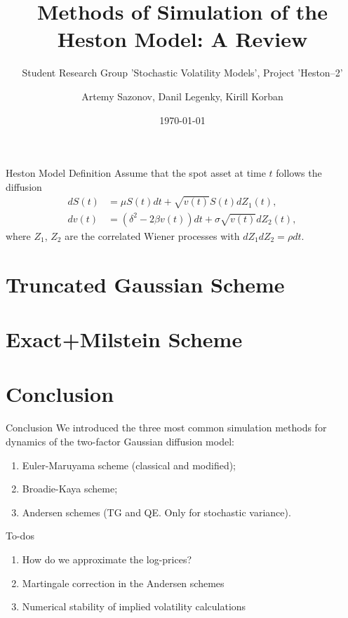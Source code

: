 \documentclass[aspectratio=169]{beamer}
\subtitle{Student Research Group 'Stochastic Volatility Models', Project 'Heston--2'}
\title{Methods of Simulation of the Heston Model: A Review}
\author{Artemy Sazonov, Danil Legenky, Kirill Korban}
\institute{Lomonosov Moscow State Univesity, Faculty of Mechanics and Mathematics}
\date{\today}
\begin{document}
    \maketitle

    \begin{frame}{Heston Model Definition}
        Assume that the spot asset at time $t$ follows the diffusion
        \begin{align}
            dS(t) & = \mu S(t)dt + \sqrt{v(t)} S(t) dZ_1(t), \label{Heston:price}\\
            dv(t) & = \left(\delta^2 - 2\beta v(t)\right) dt + \sigma\sqrt{v(t)} dZ_2(t), \label{Heston:variance}
        \end{align}
        where $Z_1$, $Z_2$ are the correlated Wiener processes with $dZ_1dZ_2 = \rho dt$.
    \end{frame}

    \section{Truncated Gaussian Scheme}
        

    \section{Exact+Milstein Scheme}
        
    
    \section{Conclusion}
        \begin{frame}{Conclusion}
            We introduced the three most common simulation methods for dynamics of the two-factor Gaussian diffusion model:
            \begin{enumerate}
                \item Euler-Maruyama scheme (classical and modified); 
                \item Broadie-Kaya scheme;
                \item Andersen schemes (TG and QE. Only for stochastic variance).
            \end{enumerate}
        \end{frame}
        \begin{frame}{To-dos}
            \begin{enumerate}
                \item How do we approximate the log-prices?
                \item Martingale correction in the Andersen schemes
                \item Numerical stability of implied volatility calculations
            \end{enumerate}
        \end{frame}
\end{document}
